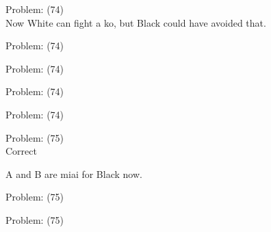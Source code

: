 \documentclass[11pt]{article}
\begin{document}
\begin{minipage}[t]{0.5\textwidth}
  {\centering
  
Problem: (74)\\
Now White can fight a ko, but Black could have avoided that.\\
  }
\end{minipage}
\begin{minipage}[t]{0.5\textwidth}
  {\centering
  
Problem: (74)\\
  }
\end{minipage}
\begin{minipage}[t]{0.5\textwidth}
  {\centering
  
Problem: (74)\\
  }
\end{minipage}
\begin{minipage}[t]{0.5\textwidth}
  {\centering
  
Problem: (74)\\
  }
\end{minipage}
\begin{minipage}[t]{0.5\textwidth}
  {\centering
  
Problem: (74)\\
  }
\end{minipage}
\begin{minipage}[t]{0.5\textwidth}
  {\centering
  
Problem: (75)\\
Correct

A and B are miai for Black now.\\
  }
\end{minipage}
\begin{minipage}[t]{0.5\textwidth}
  {\centering
  
Problem: (75)\\
  }
\end{minipage}
\begin{minipage}[t]{0.5\textwidth}
  {\centering
  
Problem: (75)\\
  }
\end{minipage}
\end{document}

